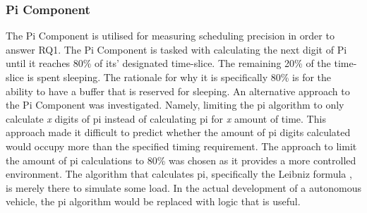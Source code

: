 
\subsubsection*{Pi Component}
The Pi Component is utilised for measuring scheduling precision in order to answer RQ1. The Pi Component is tasked with calculating the next digit of Pi until it reaches 80\% of its' designated time-slice. The remaining 20\% of the time-slice is spent sleeping. The rationale for why it is specifically 80\% is for the ability to have a buffer that is reserved for sleeping. An alternative approach to the Pi Component was investigated. Namely, limiting the pi algorithm to only calculate \textit{x} digits of pi instead of calculating pi for \textit{x} amount of time. This approach made it difficult to predict whether the amount of pi digits calculated would occupy more than the specified timing requirement. The approach to limit the amount of pi calculations to 80\% was chosen as it provides a more controlled environment. The algorithm that calculates pi, specifically the Leibniz formula \cite{leibniz}, is merely there to simulate some load. In the actual development of a autonomous vehicle, the pi algorithm would be replaced with logic that is useful. \\  



